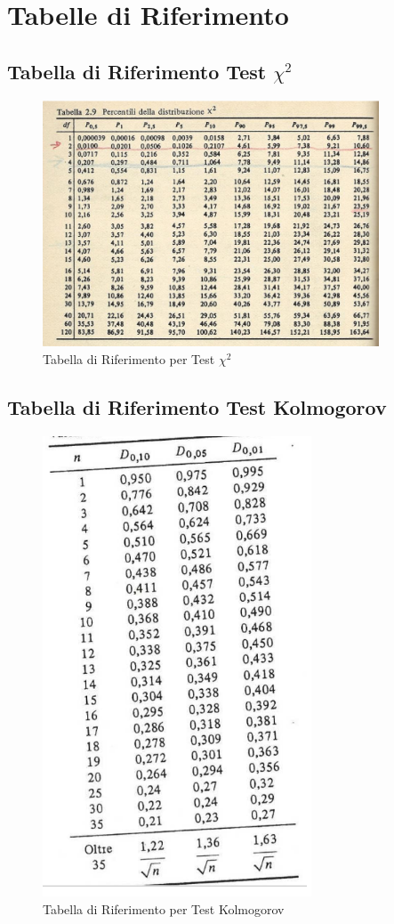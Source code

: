 \section{Tabelle di Riferimento}

\subsection{Tabella di Riferimento Test \texorpdfstring{$\chi^2$}{chi quadro}}
\begin{figure}[H]
    \centering
    \includegraphics[width=10cm, keepaspectratio]{capitoli/goodnes_of_fit/imgs/chiquadro.png}
    \caption{Tabella di Riferimento per Test $\chi^2$}
    \label{chiquadro-tabella}
\end{figure}

\subsection{Tabella di Riferimento Test Kolmogorov}

\begin{figure}[H]
    \centering
    \includegraphics[width=8cm, keepaspectratio]{capitoli/goodnes_of_fit/imgs/kolmtable.png}
    \caption{Tabella di Riferimento per Test Kolmogorov}
    \label{kolmogorov-tabella}
\end{figure}
